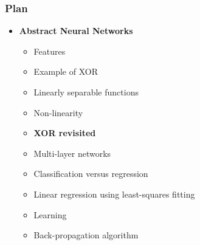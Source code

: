 %
\begin{frame}
\frametitle{Plan}

\begin{itemize}

  \item \textbf{Abstract Neural Networks}

  \begin{itemize}

    \item Features

    \item Example of XOR

    \item Linearly separable functions

    \item Non-linearity

    \item \textbf{XOR revisited}

    \item Multi-layer networks

    \item Classification versus regression

    \item Linear regression using least-squares fitting

    \item Learning

    \item Back-propagation algorithm

  \end{itemize}

\end{itemize}

\end{frame}

